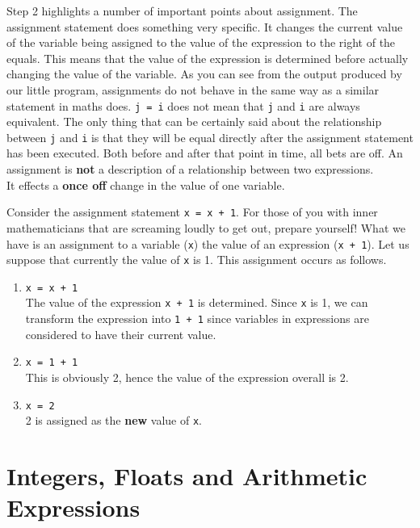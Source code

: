 Step 2 highlights a number of important points about assignment. The   assignment statement does something very specific. It changes the   current value of the variable being assigned to the value of the   expression to the right of the equals. This means that the value of the   expression is determined before actually changing the value of the   variable. As you can see from the output produced by our little   program, assignments do not behave in the same way as a   similar statement in maths does. 
\texttt{j = i} does not mean that   \texttt{j} and \texttt{i} are always equivalent. The only thing that can be certainly   said about the relationship between \texttt{j} and \texttt{i} is that they will be   equal directly after the assignment statement has been executed. Both   before and after that point in time, all bets are off.     An assignment is \textbf{not} a description of a    relationship between two expressions.
\\ It effects a    \textbf{once off} change in the value of one variable.    

Consider the assignment statement 
\texttt{x = x + 1}. For those   of you with inner mathematicians that are screaming loudly to get out,   prepare yourself! What we have is an assignment to a   variable (\texttt{x}) the value of an expression (\texttt{x + 1}). Let us suppose   that currently the value of \texttt{x} is 1. This assignment occurs as   follows.
\begin{enumerate}
	\item 
\texttt{x = x + 1}
\\     The value of the expression \texttt{x + 1} is determined. Since \texttt{x} is 1, we can transform the expression into \texttt{1 + 1} since variables in expressions are considered to have their    current value.
	\item 
\texttt{x = 1 + 1}
\\     This is obviously 2, hence the value of the expression overall is    2.
	\item 
\texttt{x = 2}
\\      2 is assigned as the \textbf{new} value of \texttt{x}.
\end{enumerate}

\section{Integers, Floats and Arithmetic Expressions}

